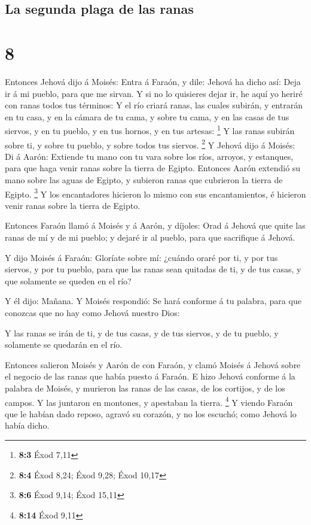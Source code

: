 \hypertarget{la-segunda-plaga-de-las-ranas}{%
\subsection{La segunda plaga de las
ranas}\label{la-segunda-plaga-de-las-ranas}}

\hypertarget{section-7}{%
\section{8}\label{section-7}}

 Entonces Jehová dijo á Moisés: Entra á Faraón, y dile:
Jehová ha dicho así: Deja ir á mi pueblo, para que me sirvan.
 Y si no lo quisieres dejar ir, he aquí yo heriré con
ranas todos tus términos:  Y el río criará ranas, las
cuales subirán, y entrarán en tu casa, y en la cámara de tu cama, y
sobre tu cama, y en las casas de tus siervos, y en tu pueblo, y en tus
hornos, y en tus artesas: \footnote{\textbf{8:3} Éxod 7,11}
 Y las ranas subirán sobre ti, y sobre tu pueblo, y sobre
todos tus siervos. \footnote{\textbf{8:4} Éxod 8,24; Éxod 9,28; Éxod
  10,17}  Y Jehová dijo á Moisés: Di á Aarón: Extiende tu
mano con tu vara sobre los ríos, arroyos, y estanques, para que haga
venir ranas sobre la tierra de Egipto.  Entonces Aarón
extendió su mano sobre las aguas de Egipto, y subieron ranas que
cubrieron la tierra de Egipto. \footnote{\textbf{8:6} Éxod 9,14; Éxod
  15,11}  Y los encantadores hicieron lo mismo con sus
encantamientos, é hicieron venir ranas sobre la tierra de Egipto.

 Entonces Faraón llamó á Moisés y á Aarón, y díjoles: Orad
á Jehová que quite las ranas de mí y de mi pueblo; y dejaré ir al
pueblo, para que sacrifique á Jehová.

 Y dijo Moisés á Faraón: Gloríate sobre mí: ¿cuándo oraré
por ti, y por tus siervos, y por tu pueblo, para que las ranas sean
quitadas de ti, y de tus casas, y que solamente se queden en el río?

 Y él dijo: Mañana. Y Moisés respondió: Se hará conforme
á tu palabra, para que conozcas que no hay como Jehová nuestro Dios:

 Y las ranas se irán de ti, y de tus casas, y de tus
siervos, y de tu pueblo, y solamente se quedarán en el río.

 Entonces salieron Moisés y Aarón de con Faraón, y clamó
Moisés á Jehová sobre el negocio de las ranas que había puesto á Faraón.
 E hizo Jehová conforme á la palabra de Moisés, y
murieron las ranas de las casas, de los cortijos, y de los campos.
 Y las juntaron en montones, y apestaban la tierra.
\footnote{\textbf{8:14} Éxod 9,11}  Y viendo Faraón que
le habían dado reposo, agravó su corazón, y no los escuchó; como Jehová
lo había dicho.


